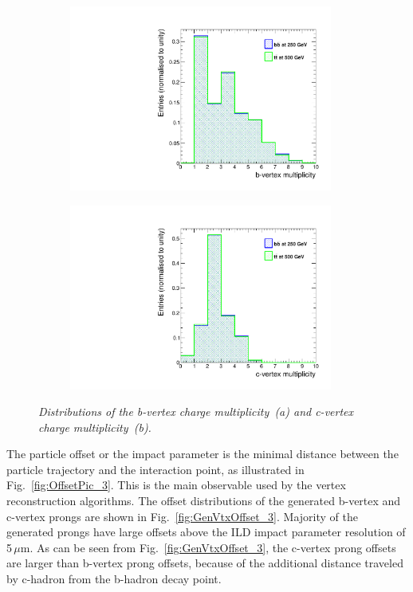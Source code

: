 \begin{figure}
\centering
\begin{subfigure}{0.5\textwidth}
    \includegraphics[width=0.95\textwidth]{ILD/plots/gen-b-vtx.pdf}
\caption{\label{fig:GenVtx_a_3} }
\end{subfigure}%
  \begin{subfigure}{0.5\textwidth}
\centering
    \includegraphics[width=0.95\textwidth]{ILD/plots/gen-c-vtx.pdf}
\caption{\label{fig:GenVtx_b_3} }
\end{subfigure}
    \caption{\sl Distributions of the b-vertex charge multiplicity~(a) and c-vertex charge multiplicity~(b). }
    \label{fig:GenVtx_3}
\end{figure}

The particle offset or the impact parameter is the minimal distance between the particle trajectory and the interaction point, as illustrated in Fig.~\ref{fig:OffsetPic_3}.
This is the main observable used by the vertex reconstruction algorithms. 
The offset distributions of the generated b-vertex and c-vertex prongs are shown in Fig.~\ref{fig:GenVtxOffset_3}.
Majority of the generated prongs have large offsets above the ILD impact parameter resolution of 5\,$\mu$m. 
As can be seen from Fig.~\ref{fig:GenVtxOffset_3}, the c-vertex prong offsets are larger than b-vertex prong offsets, because of the additional distance traveled by c-hadron from the b-hadron decay point. 

